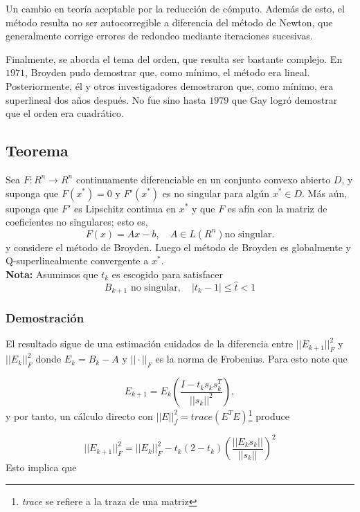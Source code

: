 \documentclass[12pt]{article}
\begin{document}
Un cambio en teoría aceptable por la reducción de cómputo. Además de esto, el método resulta no ser autocorregible a diferencia del método de Newton, que generalmente corrige errores de redondeo mediante iteraciones sucesivas.

Finalmente, se aborda el tema del orden, que resulta ser bastante complejo. En $1971$, Broyden pudo demostrar que, como mínimo, el método era lineal. Posteriormente, él y otros investigadores demostraron que, como mínimo, era superlineal dos años después. No fue sino hasta $1979$ que Gay logró demostrar que el orden era cuadrático.

\subsection{Teorema}
Sea $F: R^n \to R^n$ continuamente diferenciable en un conjunto convexo abierto $D$, y suponga que $F(x^*) = 0$ y $F'(x^*)$ es no singular para algún $x^* \in D$. Más aún, suponga que $F'$ es Lipschitz continua en $x^*$ y que $F$ es afín con la matriz de coeficientes no singulares; esto es,
\begin{equation*}
    F(x) = Ax-b, \quad A \in L(R^n) \text{no singular.}
\end{equation*}
y considere el método de Broyden. Luego el método de Broyden es globalmente y Q-superlinealmente convergente a $x^*$. \\
\textbf{Nota: } Asumimos que $t_k$ es escogido para satisfacer
\begin{equation*}
    B_{k+1} \text{ no singular}, \quad |t_k - 1| \leq \hat{t} < 1
\end{equation*}

\subsubsection{Demostración}

El resultado sigue de una estimación cuidados de la diferencia entre $||E_{k+1}||_F^2$ y $||E_k||_F^2$ donde $E_k = B_k - A$ y $||\cdot||_F$ es la norma de Frobenius. Para esto note que

\begin{equation*}
    E_{k+1} = E_k \left( \frac{I - t_k s_k s_k^T}{||s_k||^2} \right),
\end{equation*}
y por tanto, un cálculo directo con $||E||_f^2 = trace(E^TE)$\footnote{\textit{trace} se refiere a la traza de una matriz} produce

\begin{equation*}
    ||E_{k+1}||_F^2 = ||E_k||_F^2 - t_k(2 - t_k)\left(\frac{||E_k s_k||}{||s_k||}\right)^2
\end{equation*}
Esto implica que
\end{document}
